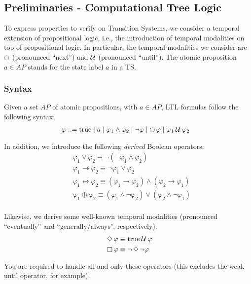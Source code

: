 \documentclass{article}
\begin{document}
\subsection{Preliminaries - Computational Tree Logic}
\label{subsec-ctl}
To express properties to verify on Transition Systems, we consider a temporal extension of propositional logic, i.e., 
the introduction of temporal modalities on top of propositional logic. In particular, the temporal
modalities we consider are $\ocircle$ (pronounced ``next'') and $\mathbin{\mathcal{U}}$ (pronounced ``until'').
The atomic proposition $a \in AP$ stands for the state label $a$ in a TS.

\subsubsection*{Syntax}
Given a set $AP$ of atomic propositions, with $a \in AP$, LTL formulas follow the following syntax: 
\begin{align*}
    &\; \varphi ::= \text{true} \mid a \mid \varphi_1 \land \varphi_2 \mid \neg \varphi \mid \mathop{\ocircle}{\varphi} \mid \varphi_1 \mathbin{\mathcal{U}} \varphi_2
\end{align*}

In addition, we introduce the following \emph{derived} Boolean operators: 
\begin{align*}
    &\; \varphi_1 \lor \varphi_2 \equiv \neg (\neg \varphi_1 \land \varphi_2) \\
    &\; \varphi_1 \rightarrow \varphi_2 \equiv \neg \varphi_1 \lor \varphi_2 \\
    &\; \varphi_1 \leftrightarrow  \varphi_2 \equiv (\varphi_1 \rightarrow \varphi_2) \land (\varphi_2 \rightarrow \varphi_1) \\
    &\; \varphi_1 \oplus  \varphi_2 \equiv (\varphi_1 \land \neg \varphi_2) \lor (\varphi_2 \land \neg \varphi_1)\\
\end{align*}

Likewise, we derive some well-known temporal modalities (pronounced ``eventually'' and ``generally/always", respectively):
\begin{align*}
    &\; \mathop{\Diamond} \varphi \equiv \text{true} \mathbin{\mathcal{U}} \varphi \\
    &\; \mathop{\square} \varphi \equiv \neg \mathop{\Diamond} \neg \varphi \\
\end{align*}

You are required to handle all and only these operators (this excludes the weak until operator, for example).
\end{document}
